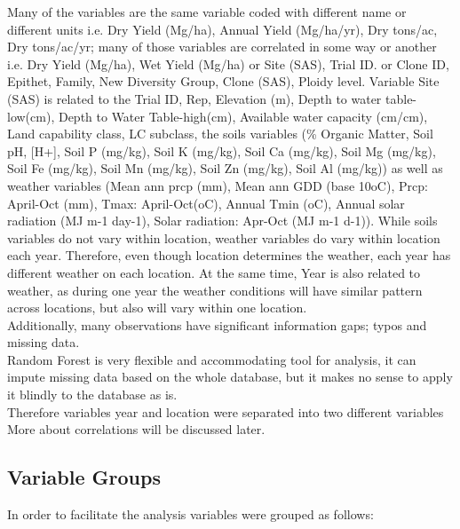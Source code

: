 \documentclass{article}\usepackage[]{graphicx}\usepackage[]{color}
\begin{document}
Many of the variables are the same variable coded with different name or different units i.e. Dry Yield (Mg/ha),  Annual Yield (Mg/ha/yr),	Dry tons/ac,	Dry tons/ac/yr; many of those variables are correlated in some way or another i.e. Dry Yield (Mg/ha), Wet Yield (Mg/ha) or Site (SAS), Trial ID. or Clone ID,  Epithet,	Family,	New Diversity Group,	Clone (SAS),	Ploidy level. Variable Site (SAS) is related to the Trial ID, Rep, Elevation (m),  Depth to water table-low(cm),	Depth to Water Table-high(cm),	Available water capacity (cm/cm),	Land capability class,	LC subclass,    the soils variables (\% Organic Matter,  Soil pH,	[H+],	Soil P (mg/kg),	Soil K (mg/kg),	Soil Ca (mg/kg),	Soil Mg (mg/kg),	Soil Fe (mg/kg),	Soil Mn (mg/kg),	Soil Zn (mg/kg),	Soil Al (mg/kg)) as well as weather variables (Mean ann prcp (mm),  Mean ann GDD (base 10oC),  Prcp: April-Oct (mm),	Tmax: April-Oct(oC),	Annual Tmin (oC),	Annual solar radiation (MJ m-1 day-1),	Solar radiation: Apr-Oct (MJ m-1 d-1)). While soils variables do not vary within location, weather variables  do vary within location each year. Therefore, even though location determines the weather, each year has different weather on each location. At the same time, Year is also related to weather, as during one year the weather conditions will have similar pattern across locations, but also will vary within one location.\\

Additionally, many observations have significant information gaps; typos and missing data. \\

Random Forest is very flexible and accommodating tool for analysis, it can impute missing data based on the whole database, but  it makes no sense to apply it blindly to the database as is.\\


Therefore variables year and location were separated into two different variables
More about correlations will be discussed later.

\subsection*{Variable Groups}

In order to facilitate the analysis variables were grouped as follows:\\
\end{document}
